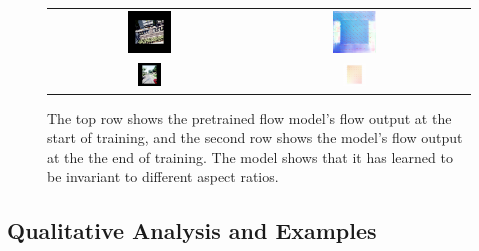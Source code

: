 \documentclass[11pt,a4paper]{article}
\begin{document}
\begin{figure}[h!]
    \centering
    \begin{tabular}{ccc} %
        \includegraphics[width=0.22\textwidth]{Reports/4-Final-Report/images/intrinsic_metric/img_bad.png} & 
        \includegraphics[width=0.22\textwidth]{Reports/4-Final-Report/images/intrinsic_metric/flow_bad.png}\\ 
        
        \includegraphics[width=0.12\textwidth]{Reports/4-Final-Report/images/intrinsic_metric/img1.png} & 
        \includegraphics[width=0.12\textwidth]{Reports/4-Final-Report/images/intrinsic_metric/flow1.png}\\ 
    \end{tabular}
    \caption{The top row shows the pretrained flow model's flow output at the start of training, and the second row shows the model's flow output at the the end of training. The model shows that it has learned to be invariant to different aspect ratios.}
    \label{fig:flow_supervision}
\end{figure}





\clearpage
\subsection{Qualitative Analysis and Examples}
\end{document}
